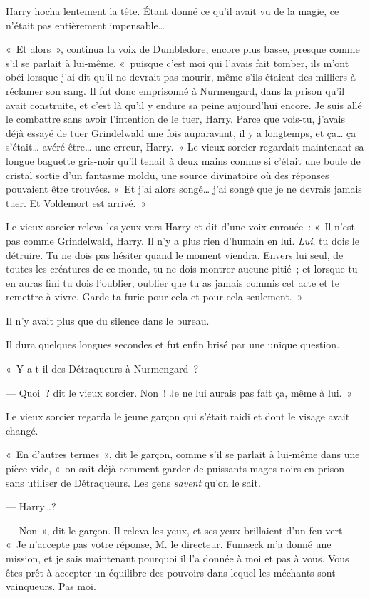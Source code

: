 Harry hocha lentement la tête.
Étant donné ce qu'il avait vu de la magie, ce n'était pas entièrement impensable…

«~Et alors~», continua la voix de Dumbledore, encore plus basse, presque comme s'il se parlait à lui-même, «~puisque c'est moi qui l'avais fait tomber, ils m'ont obéi lorsque j'ai dit qu'il ne devrait pas mourir, même s'ils étaient des milliers à réclamer son sang.
Il fut donc emprisonné à Nurmengard, dans la prison qu'il avait construite, et c'est là qu'il y endure sa peine aujourd'hui encore.
Je suis allé le combattre sans avoir l'intention de le tuer, Harry.
Parce que vois-tu, j'avais déjà essayé de tuer Grindelwald une fois auparavant, il y a longtemps, et ça… ça s'était… avéré être… une erreur, Harry.~»
Le vieux sorcier regardait maintenant sa longue baguette gris-noir qu'il tenait à deux mains comme si c'était une boule de cristal sortie d'un fantasme moldu, une source divinatoire où des réponses pouvaient être trouvées.
«~Et j'ai alors songé… j'ai songé que je ne devrais jamais tuer.
Et Voldemort est arrivé.~»

Le vieux sorcier releva les yeux vers Harry et dit d'une voix enrouée~: «~Il n'est pas comme Grindelwald, Harry.
Il n'y a plus rien d'humain en lui.
\emph{Lui}, tu dois le détruire.
Tu ne dois pas hésiter quand le moment viendra.
Envers lui seul, de toutes les créatures de ce monde, tu ne dois montrer aucune pitié~; et lorsque tu en auras fini tu dois l'oublier, oublier que tu as jamais commis cet acte et te remettre à vivre.
Garde ta furie pour cela et pour cela seulement.~»

Il n'y avait plus que du silence dans le bureau.

Il dura quelques longues secondes et fut enfin brisé par une unique question.

«~Y a-t-il des Détraqueurs à Nurmengard~?

--- Quoi~? dit le vieux sorcier.
Non~! Je ne lui aurais pas fait ça, même à lui.~»

\later

Le vieux sorcier regarda le jeune garçon qui s'était raidi et dont le visage avait changé.

«~En d'autres termes~», dit le garçon, comme s'il se parlait à lui-même dans une pièce vide, «~on sait déjà comment garder de puissants mages noirs en prison sans utiliser de Détraqueurs.
Les gens \emph{savent} qu'on le sait.

--- Harry…?

--- Non~», dit le garçon.
Il releva les yeux, et ses yeux brillaient d'un feu vert.
«~Je n'accepte pas votre réponse, M. le directeur.
Fumseck m'a donné une mission, et je sais maintenant pourquoi il l'a donnée à moi et pas à vous.
Vous êtes prêt à accepter un équilibre des pouvoirs dans lequel les méchants sont vainqueurs.
Pas moi.


